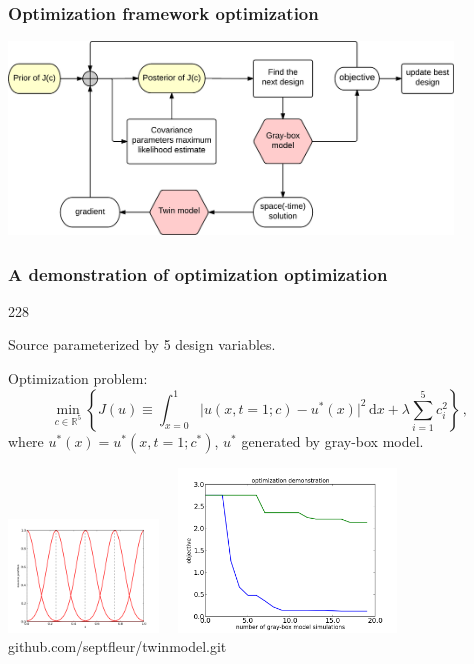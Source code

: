 \documentclass{beamer}
\newcommand{\barrow}{\item[\color{darkred}\ding{228}]}
\begin{document}
\begin{frame}
    \frametitle{Optimization framework \hfill \scriptsize{optimization}}\small
    \begin{center}
        \includegraphics[width=11.8cm]{whole.png}
    \end{center}
\end{frame}

\begin{frame}
    \frametitle{A demonstration of optimization \hfill \scriptsize{optimization}}\small
    \begin{dinglist}{228}
        \barrow Source parameterized by 5 design variables.
        \barrow Optimization problem:
        $$
            \min_{c\in\mathbb{R}^{5}} \left\{ J(u) \equiv \int_{x=0}^1 \big|u(x,t=1;c) - u^*(x)\big|^2 \,\textrm{d}x 
            + \lambda \sum_{i=1}^{5} c_i^2\right\}\,,
        $$
        where $u^*(x) = u^*(x,t=1;c^*)$, $u^*$ generated by gray-box model.
    \end{dinglist}
    \vspace{-.3cm}
    \begin{center}
        \includegraphics[width=4cm]{source_profiles.png}$\quad$
        \includegraphics[width=5.8cm]{opt_demo.png}\\\scriptsize
        github.com/septfleur/twinmodel.git
    \end{center}
\end{frame}
\end{document}
